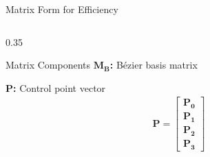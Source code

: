 \begin{frame}{Matrix Form for Efficiency}
\begin{columns}
\begin{column}{0.35\textwidth}
\begin{conceptbox}{Matrix Components}
        \textbf{$\mathbf{M_B}$:} Bézier basis matrix

        \textbf{$\mathbf{P}$:} Control point vector
        \begin{align*}
          \mathbf{P} =
          \begin{bmatrix} \mathbf{P_0} \\ \mathbf{P_1} \\ \mathbf{P_2} \\ \mathbf{P_3}
          \end{bmatrix}
        \end{align*}
      \end{conceptbox}
    \end{column}
  \end{columns}
\end{frame}

